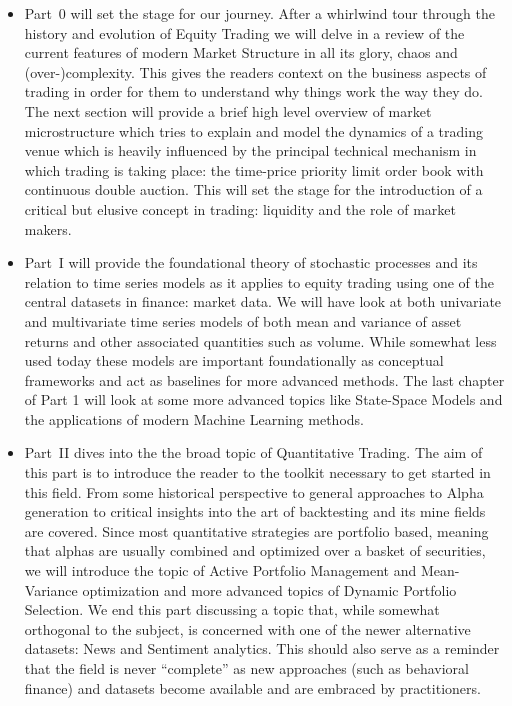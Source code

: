 \begin{itemize}
\item Part~0 will set the stage for our journey. After a whirlwind tour through the history and evolution of Equity Trading we will delve in a review of the current features of modern Market Structure in all its glory, chaos and (over-)complexity. This gives the readers context on the business aspects of trading in order for them to understand why things work the way they do. The next section will provide a brief high level overview of market microstructure which tries to explain and model the dynamics of a trading venue which is heavily influenced by the principal technical mechanism in which trading is taking place: the time-price priority limit order book with  continuous double auction. This will set the stage for the introduction of a critical but elusive concept in trading: liquidity and the role of market makers.

\item Part~I will provide the foundational theory of stochastic processes and its relation to time series models as it applies to equity trading using one of the central datasets in finance: market data. We will have look at both univariate and multivariate time series models of both mean and variance of asset returns and other associated quantities such as volume. While somewhat less used today these models are important foundationally as conceptual frameworks and act as baselines for more advanced methods. The last chapter of Part 1 will look at some more advanced topics like State-Space Models and the applications of modern Machine Learning methods.

\item Part~II dives into the the broad topic of Quantitative Trading. The aim of this part is to introduce the reader to the toolkit necessary to get started in this field. From some historical perspective to general approaches to Alpha generation to critical insights into the art of backtesting and its mine fields are covered. Since most quantitative strategies are portfolio based, meaning that alphas are usually  combined  and optimized over a basket of securities, we will introduce the topic of Active Portfolio Management and Mean-Variance optimization and more advanced topics of Dynamic Portfolio Selection. We end this part discussing a topic that, while somewhat orthogonal to the subject, is concerned with one of the newer alternative datasets: News and Sentiment analytics. This should also serve as a reminder that the field is never ``complete'' as new approaches (such as behavioral finance) and datasets become available and are embraced by practitioners.


\end{itemize}
